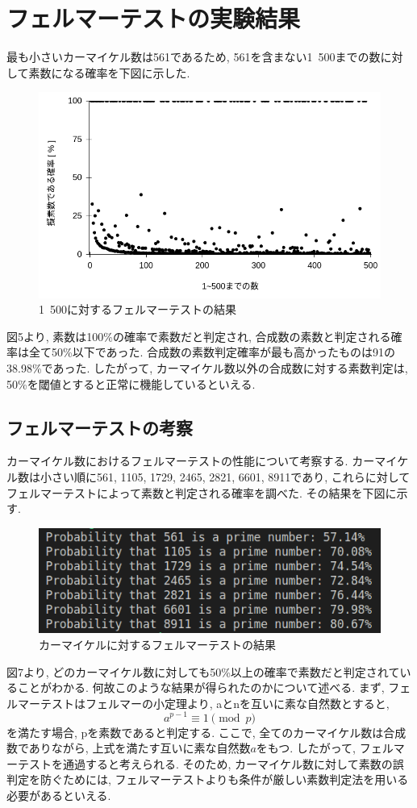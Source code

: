 \documentclass[xelatex, 11pt, a4paper, ja=standard]{bxjsarticle}
\begin{document}
\section{フェルマーテストの実験結果}
最も小さいカーマイケル数は561であるため, 561を含まない1~500までの数に対して素数になる確率を下図に示した. 
\begin{figure}[htbp]
    \centering
    \includegraphics[height=0.5\textwidth,keepaspectratio]{./image/felmer.png}
    \caption{1~500に対するフェルマーテストの結果}
    \label{fig:screenshot}
\end{figure}

図5より, 素数は100\%の確率で素数だと判定され, 合成数の素数と判定される確率は全て50\%以下であった. 
合成数の素数判定確率が最も高かったものは91の38.98\%であった. 
したがって, カーマイケル数以外の合成数に対する素数判定は, 50\%を閾値とすると正常に機能しているといえる. 

\subsection{フェルマーテストの考察}
カーマイケル数におけるフェルマーテストの性能について考察する. 
カーマイケル数は小さい順に561, 1105, 1729, 2465, 2821, 6601, 8911であり, 
これらに対してフェルマーテストによって素数と判定される確率を調べた. 
その結果を下図に示す. 
\begin{figure}[htbp]
    \centering
    \includegraphics[height=0.15\textwidth,keepaspectratio]{./image/carmichael_felmer.png}
    \caption{カーマイケルに対するフェルマーテストの結果}
    \label{fig:screenshot}
\end{figure}
図7より, どのカーマイケル数に対しても50\%以上の確率で素数だと判定されていることがわかる. 
何故このような結果が得られたのかについて述べる. 
まず, フェルマーテストはフェルマーの小定理より, aとnを互いに素な自然数とすると, \begin{equation*} a^{p-1} \equiv 1 \pmod{p} \end{equation*}
を満たす場合, pを素数であると判定する. 
ここで, 全てのカーマイケル数は合成数でありながら, 上式を満たす互いに素な自然数$a$をもつ. 
したがって, フェルマーテストを通過すると考えられる. 
そのため, カーマイケル数に対して素数の誤判定を防ぐためには, 
フェルマーテストよりも条件が厳しい素数判定法を用いる必要があるといえる. 
\end{document}
